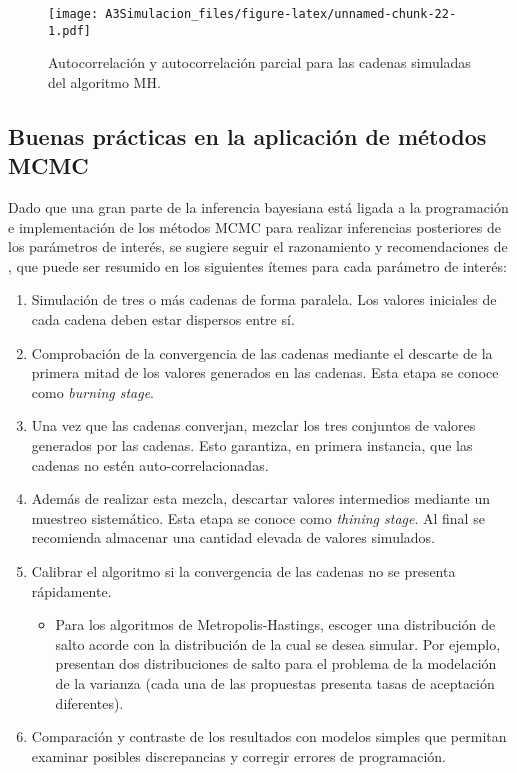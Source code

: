\documentclass[
  spanish,
]{book}
\providecommand{\tightlist}{%
  \setlength{\itemsep}{0pt}\setlength{\parskip}{0pt}}
\theoremstyle{definition}
\theoremstyle{definition}
\theoremstyle{definition}
\theoremstyle{definition}
\theoremstyle{remark}
\begin{document}
\begin{figure}
\centering
\texttt{[image: A3Simulacion\_files/figure-latex/unnamed-chunk-22-1.pdf]}
\caption{\label{fig:unnamed-chunk-22}Autocorrelación y autocorrelación parcial para las cadenas simuladas del algoritmo MH.}
\end{figure}

\hypertarget{buenas-pruxe1cticas-en-la-aplicaciuxf3n-de-muxe9todos-mcmc}{%
\subsection{Buenas prácticas en la aplicación de métodos MCMC}\label{buenas-pruxe1cticas-en-la-aplicaciuxf3n-de-muxe9todos-mcmc}}

Dado que una gran parte de la inferencia bayesiana está ligada a la programación e implementación de los métodos MCMC para realizar inferencias posteriores de los parámetros de interés, se sugiere seguir el razonamiento y recomendaciones de \citet{GelShir2010}, que puede ser resumido en los siguientes ítemes para cada parámetro de interés:

\begin{enumerate}
\def\labelenumi{\arabic{enumi}.}
\tightlist
\item
  Simulación de tres o más cadenas de forma paralela. Los valores iniciales de cada cadena deben estar dispersos entre sí.
\item
  Comprobación de la convergencia de las cadenas mediante el descarte de la primera mitad de los valores generados en las cadenas. Esta etapa se conoce como \emph{burning stage}.
\item
  Una vez que las cadenas converjan, mezclar los tres conjuntos de valores generados por las cadenas. Esto garantiza, en primera instancia, que las cadenas no estén auto-correlacionadas.
\item
  Además de realizar esta mezcla, descartar valores intermedios mediante un muestreo sistemático. Esta etapa se conoce como \emph{thining stage}. Al final se recomienda almacenar una cantidad elevada de valores simulados.
\item
  Calibrar el algoritmo si la convergencia de las cadenas no se presenta rápidamente.

  \begin{itemize}
  \tightlist
  \item
    Para los algoritmos de Metropolis-Hastings, escoger una distribución de salto acorde con la distribución de la cual se desea simular. Por ejemplo, \citet{Cepe1} presentan dos distribuciones de salto para el problema de la modelación de la varianza (cada una de las propuestas presenta tasas de aceptación diferentes).
  \end{itemize}
\item
  Comparación y contraste de los resultados con modelos simples que permitan examinar posibles discrepancias y corregir errores de programación.
\end{enumerate}
\end{document}
